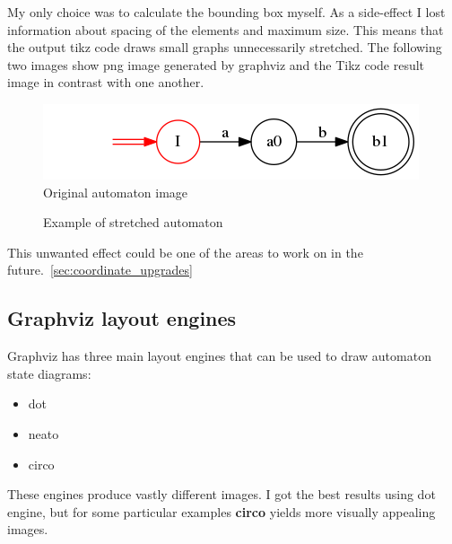 \documentclass{ctuthesis}
\begin{document}
My only choice was to calculate the bounding box myself. As a side-effect I lost information about spacing of the elements and maximum size. This means that the output tikz code draws small graphs unnecessarily stretched. The following two images show png image generated by graphviz and the Tikz code result image in contrast with one another. 

\begin{figure}[H]
\includegraphics[width=0.5\linewidth]{figures/not_stretched.png}
\caption{Original automaton image}
\label{fig:not_stretched_automaton}
\end{figure}

\begin{figure}[H]
\caption{Example of stretched automaton}
\label{fig:stretched_automaton}
\end{figure}

This unwanted effect could be one of the areas to work on in the future.~\ref{sec:coordinate_upgrades}

\subsection{Graphviz layout engines}
Graphviz has three main layout engines that can be used to draw automaton state diagrams:
\begin{itemize}
	\item dot
	\item neato
	\item circo
\end{itemize}

These engines produce vastly different images. I got the best results using dot engine, but for some particular examples \textbf{circo} yields more visually appealing images. 
\end{document}
